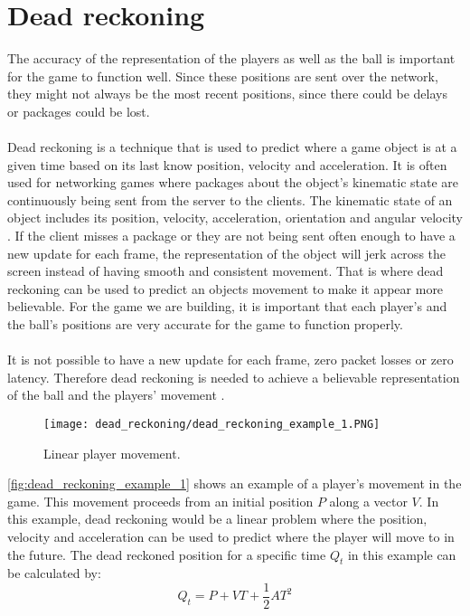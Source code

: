 \section{Dead reckoning}
The accuracy of the representation of the players as well as the ball is important for the game to function well.
Since these positions are sent over the network, they might not always be the most recent positions, since there could be delays or packages could be lost.
\\\\
Dead reckoning is a technique that is used to predict where a game object is at a given time based on its last know position, velocity and acceleration.
It is often used for networking games where packages about the object's kinematic state are continuously being sent from the server to the clients.
The kinematic state of an object includes its position, velocity, acceleration, orientation and angular velocity \autocite{DeadReckoning}.
If the client misses a package or they are not being sent often enough to have a new update for each frame, the representation of the object will jerk across the screen instead of having smooth and consistent movement.
That is where dead reckoning can be used to predict an objects movement to make it appear more believable.
For the game we are building, it is important that each player's and the ball's positions are very accurate for the game to function properly.
\\\\
It is not possible to have a new update for each frame, zero packet losses or zero latency. 
Therefore dead reckoning is needed to achieve a believable representation of the ball and the players' movement \autocite{DeadReckoning}.
\begin{figure}[H]
    \centering
    \texttt{[image: dead\_reckoning/dead\_reckoning\_example\_1.PNG]}
    \caption{Linear player movement.}
    \label{fig:dead_reckoning_example_1}
\end{figure}
\noindent
\autoref{fig:dead_reckoning_example_1} shows an example of a player's movement in the game.
This movement proceeds from an initial position $P$ along a vector $V$.
In this example, dead reckoning would be a linear problem where the position, velocity and acceleration can be used to predict where the player will move to in the future. 
The dead reckoned position for a specific time $Q_t$ in this example can be calculated by:
\begin{displaymath}
    Q_t = P + VT + \frac{1}{2}AT^2
\end{displaymath}
